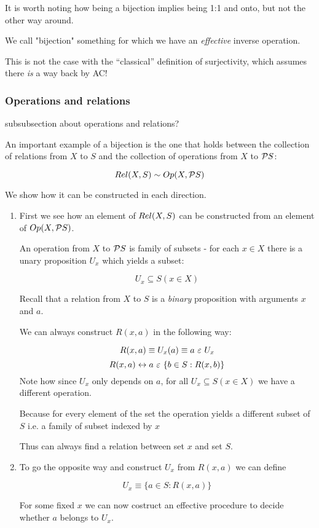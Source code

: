 It is worth noting how being a bijection implies being 1:1 and onto,
but not the other way around.

We call "bijection" something for which we have an \emph{effective}
inverse operation.

This is not the case with the ``classical'' definition of
surjectivity, which assumes there \emph{is} a way back by AC!


\subsubsection{Operations and relations} %
subsubsection about operations and relations?

An important example of a bijection is the one that holds between the
collection of relations from $X$ to $S$ and the collection of
operations from $X$ to $\mathcal{P}S$:

\[ {Rel}(X,S) \sim {Op}(X,\mathcal{P}S) \]

We show how it can be constructed in each direction.

\begin{enumerate}
\item First we see how an element of ${Rel}(X,S)$ can be constructed
  from an element of ${Op}(X,\mathcal{P}S)$.

  An operation from $X$ to $\mathcal{P}S$ is family of subsets - for
  each $x \in X$ there is a unary proposition \(U_x\) which yields a
  subset:

  \[ U_x \subseteq S (x \in X) \]

  Recall that a relation from $X$ to $S$ is a \emph{binary}
  proposition with arguments $x$ and $a$.

  We can always construct $R(x,a)$ in the following way:

  \[ R(x,a) \equiv U_x(a) \equiv a\ \varepsilon\ U_x \]
  \[ R(x,a) \leftrightarrow a\ \varepsilon\ \{b \in S : R(x,b)\} \]
  Note how since \(U_x\) only depends on \(a\), for all \(U_x \subseteq
  S(x \in X)\) we have a different operation.

  Because for every element of the set the operation yields a
  different subset of \(S\) i.e. a family of subset indexed by \(x\)

  Thus can always find a relation between set \(x\) and set \(S\).

\item To go the opposite way and construct $U_x$ from \(R(x,a)\) we
  can define

  \[ U_x \equiv \{ a \in S : R(x,a) \} \]

  For some fixed \(x\) we can now costruct an effective procedure to
  decide whether $a$ belongs to $U_x$.  %
\end{enumerate}

